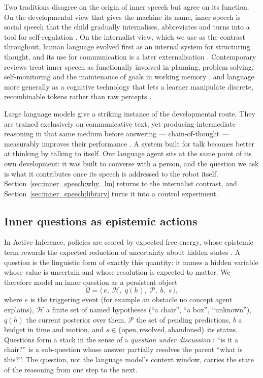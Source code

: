 Two traditions disagree on the origin of inner speech but agree on its function. On the developmental view that
gives the machine its name, inner speech is social speech that the child gradually internalises, abbreviates and
turns into a tool for self-regulation \cite{vygotsky1986thought}. On the internalist view, which we use as the
contrast throughout, human language evolved first as an internal system for structuring thought, and its use for
communication is a later externalisation \cite{berwick2016why}. Contemporary reviews treat inner speech as
functionally involved in planning, problem solving, self-monitoring and the maintenance of goals in working memory
\cite{aldersonday2015inner}, and language more generally as a cognitive technology that lets a learner manipulate
discrete, recombinable tokens rather than raw percepts \cite{clark1998magic}.

Large language models give a striking instance of the developmental route. They are trained exclusively on
communicative text, yet producing intermediate reasoning in that same medium before answering --- chain-of-thought
--- measurably improves their performance \cite{wei2022chain}. A system built for talk becomes better at thinking
by talking to itself. Our language agent sits at the same point of its own development: it was built to converse
with a person, and the question we ask is what it contributes once its speech is addressed to the robot itself.
Section~\ref{sec:inner_speech:why_lm} returns to the internalist contrast, and Section~\ref{sec:inner_speech:library}
turns it into a control experiment.

\subsection{Inner questions as epistemic actions}
\label{sec:inner_speech:questions}

In Active Inference, policies are scored by expected free energy, whose epistemic term rewards the expected
reduction of uncertainty about hidden states \cite{friston2017process, parr2022active}. A question is the
linguistic form of exactly this quantity: it names a hidden variable whose value is uncertain and whose resolution
is expected to matter. We therefore model an inner question as a persistent object
\begin{equation}
    \mathcal{Q} = \big\langle\, e,\; \mathcal{H},\; q(h),\; \mathcal{P},\; b,\; s \,\big\rangle ,
    \label{eq:inner_question}
\end{equation}
where $e$ is the triggering event (for example an obstacle no concept agent explains), $\mathcal{H}$ a finite set
of named hypotheses (``a chair'', ``a box'', ``unknown''), $q(h)$ the current posterior over them, $\mathcal{P}$
the set of pending predictions, $b$ a budget in time and motion, and $s \in \{\text{open},\text{resolved},
\text{abandoned}\}$ its status. Questions form a stack in the sense of a \emph{question under discussion}
\cite{roberts2012information}: ``is it a chair?'' is a sub-question whose answer partially resolves the parent
``what is this?''. The question, not the language model's context window, carries the state of the reasoning from
one step to the next.

